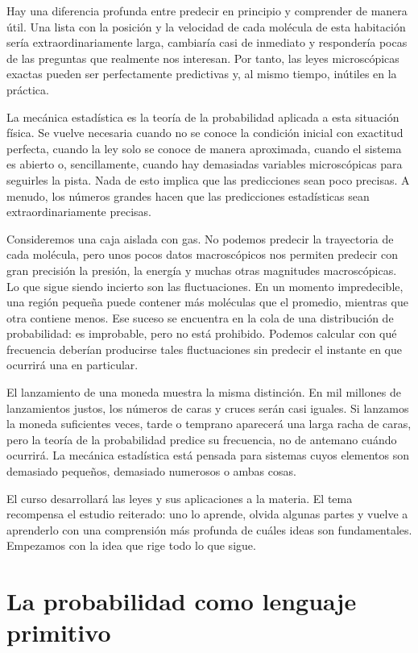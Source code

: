 Hay una diferencia profunda entre predecir en principio y comprender de manera útil. Una lista con la posición y la velocidad de cada molécula de esta habitación sería extraordinariamente larga, cambiaría casi de inmediato y respondería pocas de las preguntas que realmente nos interesan. Por tanto, las leyes microscópicas exactas pueden ser perfectamente predictivas y, al mismo tiempo, inútiles en la práctica.

La mecánica estadística es la teoría de la probabilidad aplicada a esta situación física. Se vuelve necesaria cuando no se conoce la condición inicial con exactitud perfecta, cuando la ley solo se conoce de manera aproximada, cuando el sistema es abierto o, sencillamente, cuando hay demasiadas variables microscópicas para seguirles la pista. Nada de esto implica que las predicciones sean poco precisas. A menudo, los números grandes hacen que las predicciones estadísticas sean extraordinariamente precisas.

Consideremos una caja aislada con gas. No podemos predecir la trayectoria de cada molécula, pero unos pocos datos macroscópicos nos permiten predecir con gran precisión la presión, la energía y muchas otras magnitudes macroscópicas. Lo que sigue siendo incierto son las fluctuaciones. En un momento impredecible, una región pequeña puede contener más moléculas que el promedio, mientras que otra contiene menos. Ese suceso se encuentra en la cola de una distribución de probabilidad: es improbable, pero no está prohibido. Podemos calcular con qué frecuencia deberían producirse tales fluctuaciones sin predecir el instante en que ocurrirá una en particular.

El lanzamiento de una moneda muestra la misma distinción. En mil millones de lanzamientos justos, los números de caras y cruces serán casi iguales. Si lanzamos la moneda suficientes veces, tarde o temprano aparecerá una larga racha de caras, pero la teoría de la probabilidad predice su frecuencia, no de antemano cuándo ocurrirá. La mecánica estadística está pensada para sistemas cuyos elementos son demasiado pequeños, demasiado numerosos o ambas cosas.

El curso desarrollará las leyes y sus aplicaciones a la materia. El tema recompensa el estudio reiterado: uno lo aprende, olvida algunas partes y vuelve a aprenderlo con una comprensión más profunda de cuáles ideas son fundamentales. Empezamos con la idea que rige todo lo que sigue.

\section{La probabilidad como lenguaje primitivo}

